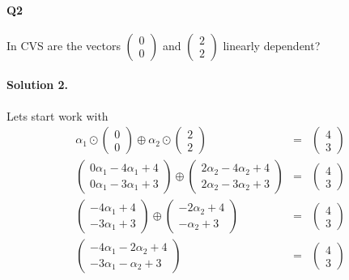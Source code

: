 \documentclass[11pt]{article}
\begin{document}
\paragraph{Q2}In CVS are the vectors 
$
\begin{pmatrix}
0\\
0
\end{pmatrix}
$
and
$
\begin{pmatrix}
2\\
2
\end{pmatrix}
$
linearly dependent?
\paragraph{Solution 2.}Lets start work with
\begin{eqnarray*}
\alpha_1
\odot
\begin{pmatrix}
0\\
0
\end{pmatrix}
\oplus
\alpha_2
\odot
\begin{pmatrix}
2\\
2
\end{pmatrix}
&=&
\begin{pmatrix}
4\\
3
\end{pmatrix}\\
\begin{pmatrix}
0\alpha_1 -4\alpha_1 +4\\
0\alpha_1 -3\alpha_1 +3
\end{pmatrix}
\oplus
\begin{pmatrix}
2\alpha_2 -4\alpha_2 +4\\
2\alpha_2 -3\alpha_2 +3
\end{pmatrix}
&=&
\begin{pmatrix}
4\\
3
\end{pmatrix}\\
\begin{pmatrix}
-4\alpha_1 +4\\
-3\alpha_1 +3
\end{pmatrix}
\oplus
\begin{pmatrix}
-2\alpha_2 +4\\
-\alpha_2 +3
\end{pmatrix}
&=&
\begin{pmatrix}
4\\
3
\end{pmatrix}\\
\begin{pmatrix}
-4\alpha_1 -2\alpha_2 +4\\
-3\alpha_1 -\alpha_2 +3
\end{pmatrix}
&=&
\begin{pmatrix}
4\\
3
\end{pmatrix}
\end{eqnarray*}
\end{document}
